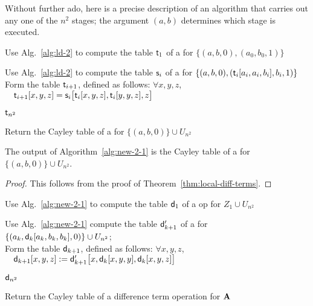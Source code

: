 \documentclass{ws-ijac}
\begin{document}
Without further ado, here is a precise description of an algorithm that carries out any one
of the $n^2$ stages; the argument $(a,b)$ determines which stage is executed.
\begin{algorithm}

  Use Alg.~\ref{alg:ld-2} to compute the table $\mathsf{t}_1$ of a \ldto for $\{(a,b, 0), (a_0, b_0, 1)\}$\;

   {
    Use Alg.~\ref{alg:ld-2} to compute the table $\mathsf{s}_i$ of a \ldto for $\{(a,b, 0), (\mathsf{t}_i[a_i, a_i, b_i], b_i, 1)\}$\\[6pt]
    Form the table $\mathsf{t}_{i+1}$, defined as follows: $\forall x,y,z$,\\
    $\quad \mathsf{t}_{i+1}[x,y,z] = \mathsf{s}_i\bigl[\mathsf{t}_i[x,y,z], \mathsf{t}_i[y,y,z], z\bigr]$\;
  }

  \Return $\mathsf{t}_{n^2}$
  \caption{Return the Cayley table of a \ldto for $\{(a,b,0)\}\cup U_{n^2}$\label{alg:new-2-1}}
\end{algorithm}


\begin{lemma}
  \label{lem:19}
  The output of Algorithm~\ref{alg:new-2-1} is the Cayley table of a \ldto for
  $\{(a,b,0)\} \cup U_{n^2}$. %
\end{lemma}

\begin{proof}
  This follows from the proof of Theorem~\ref{thm:local-diff-terms}.
\end{proof}

\begin{algorithm}

  Use Alg.~\ref{alg:new-2-1} to compute the table $\mathsf{d}_1$ of a \ldt op for
  $Z_1 \cup U_{n^2}$\; %

   {

    Use Alg.~\ref{alg:new-2-1} compute the table $\mathsf{d}'_{k+1}$ of a \ldto for $\{(a_k, \mathsf{d}_{k}[a_k, b_k, b_k], 0)\} \cup U_{n^2}$;\\[4pt]
    Form the table $\mathsf{d}_{k+1}$, defined as follows: $\forall x,y,z$,\\
    $\quad \mathsf{d}_{k+1}[x,y,z] := \mathsf{d}'_{k+1}\bigl[x, \mathsf{d}_{k}[x,y,y], \mathsf{d}_{k}[x,y,z]\bigr]$\;
  }
  \Return $\mathsf{d}_{n^2}$
  \caption{Return the Cayley table of a difference term operation for $\mathbf{A}$\label{alg:new-2-3}}
\end{algorithm}
\end{document}
